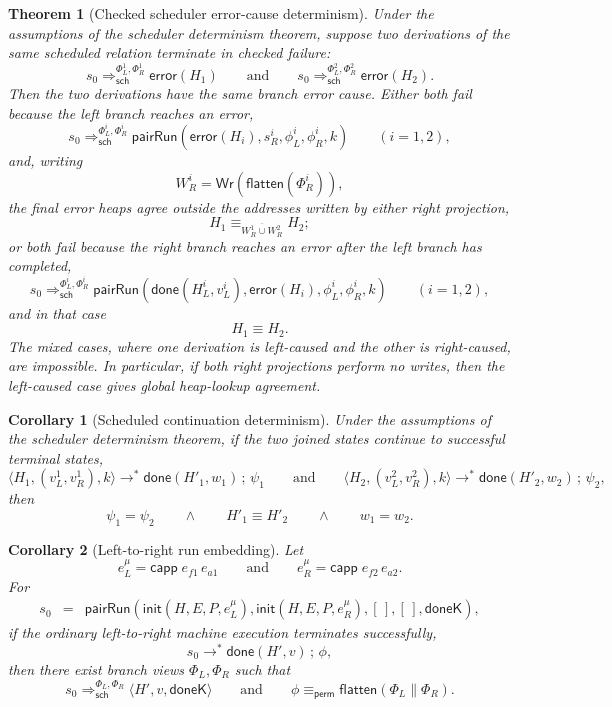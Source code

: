 \documentclass[10pt,a4paper]{article}
\newcommand{\capp}{\mathsf{capp}\;}
\newtheorem{theorem}{Theorem}
\newtheorem{corollary}{Corollary}
\begin{document}
\begin{theorem}[Checked scheduler error-cause determinism]
Under the assumptions of the scheduler determinism theorem, suppose two
derivations of the same scheduled relation terminate in checked failure:
\[
s_0
  \Longrightarrow_{\mathsf{sch}}^{\Phi_L^1,\Phi_R^1}
  \mathsf{error}(H_1)
\qquad\text{and}\qquad
s_0
  \Longrightarrow_{\mathsf{sch}}^{\Phi_L^2,\Phi_R^2}
  \mathsf{error}(H_2).
\]
Then the two derivations have the same branch error cause.  Either both fail
because the left branch reaches an error,
\[
s_0
  \Longrightarrow_{\mathsf{sch}}^{\Phi_L^i,\Phi_R^i}
  \mathsf{pairRun}(
    \mathsf{error}(H_i),s_R^i,\phi_L^i,\phi_R^i,k)
\qquad(i=1,2),
\]
and, writing
\[
W_R^i=\mathsf{Wr}(\mathsf{flatten}(\Phi_R^i)),
\]
the final error heaps agree outside the addresses written by either right
projection,
\[
H_1\equiv_{\overline{W_R^1\cup W_R^2}}H_2;
\]
or both fail because the right branch reaches an error after the left branch
has completed,
\[
s_0
  \Longrightarrow_{\mathsf{sch}}^{\Phi_L^i,\Phi_R^i}
  \mathsf{pairRun}(
    \mathsf{done}(H_L^i,v_L^i),\mathsf{error}(H_i),
    \phi_L^i,\phi_R^i,k)
\qquad(i=1,2),
\]
and in that case
\[
H_1\equiv H_2.
\]
The mixed cases, where one derivation is left-caused and the other is
right-caused, are impossible.  In particular, if both right projections perform
no writes, then the left-caused case gives global heap-lookup agreement.
\end{theorem}

\begin{corollary}[Scheduled continuation determinism]
Under the assumptions of the scheduler determinism theorem, if the two joined
states continue to successful terminal states,
\[
\langle H_1,(v_L^1,v_R^1),k\rangle
  \longrightarrow^{*}\mathsf{done}(H'_1,w_1)\,;\,\psi_1
\qquad\text{and}\qquad
\langle H_2,(v_L^2,v_R^2),k\rangle
  \longrightarrow^{*}\mathsf{done}(H'_2,w_2)\,;\,\psi_2,
\]
then
\[
\psi_1=\psi_2
\qquad\land\qquad
H'_1\equiv H'_2
\qquad\land\qquad
w_1=w_2.
\]
\end{corollary}

\begin{corollary}[Left-to-right run embedding]
Let
\[
e_L^\mu=\capp e_{f1}\,e_{a1}
\qquad\text{and}\qquad
e_R^\mu=\capp e_{f2}\,e_{a2}.
\]
For
\[
\begin{array}{rcl}
s_0 & = &
\mathsf{pairRun}(
  \mathsf{init}(H,E,P,e_L^\mu),
  \mathsf{init}(H,E,P,e_R^\mu),
  [\,],[\,],\mathsf{doneK}),
\end{array}
\]
if the ordinary left-to-right machine execution terminates successfully,
\[
s_0\longrightarrow^{*}\mathsf{done}(H',v)\,;\,\phi,
\]
then there exist branch views $\Phi_L,\Phi_R$ such that
\[
s_0\Longrightarrow_{\mathsf{sch}}^{\Phi_L,\Phi_R}
  \langle H',v,\mathsf{doneK}\rangle
\qquad\text{and}\qquad
\phi\equiv_{\mathsf{perm}}
\mathsf{flatten}(\Phi_L\parallel\Phi_R).
\]
\end{corollary}
\end{document}
